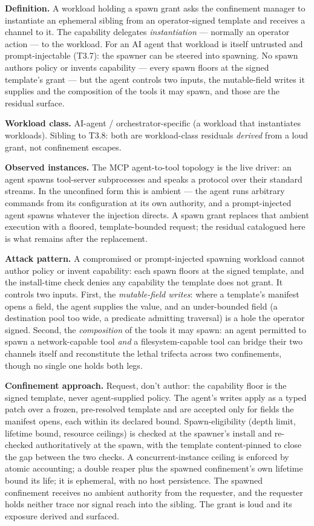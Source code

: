 \textbf{Definition.} A workload holding a spawn grant asks the
confinement manager to instantiate an ephemeral sibling from an
operator-signed template and receives a channel to it. The capability
delegates \emph{instantiation} --- normally an operator action --- to
the workload. For an AI agent that workload is itself untrusted and
prompt-injectable (T3.7): the spawner can be steered into spawning. No
spawn authors policy or invents capability --- every spawn floors at the
signed template's grant --- but the agent controls two inputs, the
mutable-field writes it supplies and the composition of the tools it may
spawn, and those are the residual surface.

\textbf{Workload class.} AI-agent / orchestrator-specific (a workload
that instantiates workloads). Sibling to T3.8: both are workload-class
residuals \emph{derived} from a loud grant, not confinement escapes.

\textbf{Observed instances.} The MCP agent-to-tool topology is the live
driver: an agent spawns tool-server subprocesses and speaks a protocol
over their standard streams. In the unconfined form this is ambient ---
the agent runs arbitrary commands from its configuration at its own
authority, and a prompt-injected agent spawns whatever the injection
directs. A spawn grant replaces that ambient execution with a floored,
template-bounded request; the residual catalogued here is what remains
after the replacement.

\textbf{Attack pattern.} A compromised or prompt-injected spawning
workload cannot author policy or invent capability: each spawn floors at
the signed template, and the install-time check denies any capability
the template does not grant. It controls two inputs. First, the
\emph{mutable-field writes}: where a template's manifest opens a field,
the agent supplies the value, and an under-bounded field (a destination
pool too wide, a predicate admitting traversal) is a hole the operator
signed. Second, the \emph{composition} of the tools it may spawn: an
agent permitted to spawn a network-capable tool \emph{and} a
filesystem-capable tool can bridge their two channels itself and
reconstitute the lethal trifecta across two confinements, though no
single one holds both legs.

\textbf{Confinement approach.} Request, don't author: the capability
floor is the signed template, never agent-supplied policy. The agent's
writes apply as a typed patch over a frozen, pre-resolved template and
are accepted only for fields the manifest opens, each within its
declared bound. Spawn-eligibility (depth limit, lifetime bound, resource
ceilings) is checked at the spawner's install and re-checked
authoritatively at the spawn, with the template content-pinned to close
the gap between the two checks. A concurrent-instance ceiling is
enforced by atomic accounting; a double reaper plus the spawned
confinement's own lifetime bound its life; it is ephemeral, with no host
persistence. The spawned confinement receives no ambient authority from
the requester, and the requester holds neither trace nor signal reach
into the sibling. The grant is loud and its exposure derived and
surfaced.


